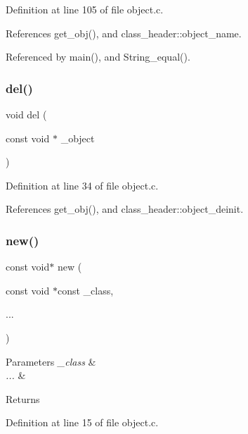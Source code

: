 Definition at line 105 of file object.\+c.



References get\+\_\+obj(), and class\+\_\+header\+::object\+\_\+name.



Referenced by main(), and String\+\_\+equal().

\mbox{\label{group__low_gae293fe2fbbf9f2e8a87c1141e7412814}} 
\subsubsection{\texorpdfstring{del()}{del()}}
{\footnotesize\ttfamily void del (\begin{DoxyParamCaption}\item[{const void $\ast$}]{\+\_\+object }\end{DoxyParamCaption})}



Definition at line 34 of file object.\+c.



References get\+\_\+obj(), and class\+\_\+header\+::object\+\_\+deinit.

\mbox{\label{group__low_gaa356efc2c9e72711bf56b41a4f7b125f}} 
\subsubsection{\texorpdfstring{new()}{new()}}
{\footnotesize\ttfamily const void$\ast$ new (\begin{DoxyParamCaption}\item[{const void $\ast$const}]{\+\_\+class,  }\item[{}]{... }\end{DoxyParamCaption})}


\begin{DoxyParams}{Parameters}
{\em \+\_\+class} & \\
\hline
{\em ...} & \\
\hline
\end{DoxyParams}
\begin{DoxyReturn}{Returns}

\end{DoxyReturn}


Definition at line 15 of file object.\+c.



